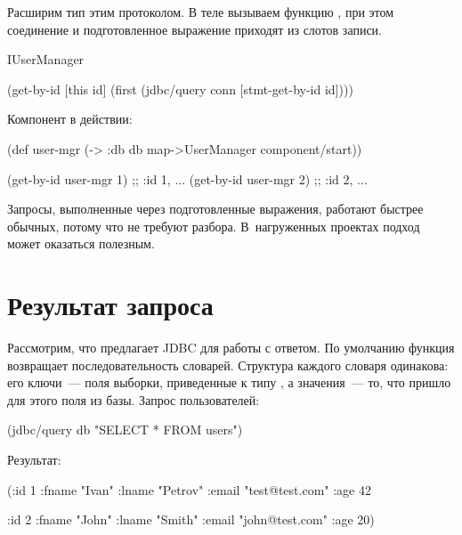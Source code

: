 Расширим тип  этим протоколом. В теле  вызываем функцию , при этом соединение и подготовленное выражение приходят из слотов записи.

\begin{english}
  \begin{clojure}
IUserManager

(get-by-id [this id]
  (first
    (jdbc/query conn [stmt-get-by-id id])))
  \end{clojure}
\end{english}

Компонент в действии:

\begin{english}
  \begin{clojure}
(def user-mgr
  (-> {:db db}
      map->UserManager
      component/start))

(get-by-id user-mgr 1) ;; {:id 1, ...}
(get-by-id user-mgr 2) ;; {:id 2, ...}
  \end{clojure}
\end{english}

Запросы, выполненные через подготовленные выражения, работают быстрее обычных, потому что не требуют разбора. В~нагруженных проектах подход может оказаться полезным.

\section{Результат запроса}

Рассмотрим, что предлагает JDBC для работы с ответом. По умолчанию функция  возвращает последовательность словарей. Структура каждого словаря одинакова: его ключи~--- поля выборки, приведенные к типу , а значения~--- то, что пришло для этого поля из базы. Запрос пользователей:

\begin{english}
  \begin{clojure}
(jdbc/query db "SELECT * FROM users")
  \end{clojure}
\end{english}

Результат:

\begin{english}
  \begin{clojure}
({:id 1
  :fname "Ivan"
  :lname "Petrov"
  :email "test@test.com"
  :age 42}

 {:id 2
  :fname "John"
  :lname "Smith"
  :email "john@test.com"
  :age 20})
  \end{clojure}
\end{english}


